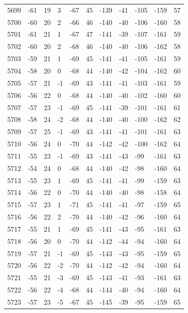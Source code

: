 \begin{table}[H]
\begin{tabular}{lllllllllll}
5699 & -61 & 19 & 3 & -67 & 45 & -139 & -41 & -105 & -159 & 57 \\
5700 & -60 & 20 & 2 & -66 & 46 & -140 & -40 & -106 & -160 & 58 \\
5701 & -61 & 21 & 1 & -67 & 47 & -141 & -39 & -107 & -161 & 59 \\
5702 & -60 & 20 & 2 & -68 & 46 & -140 & -40 & -106 & -162 & 58 \\
5703 & -59 & 21 & 1 & -69 & 45 & -141 & -41 & -105 & -161 & 59 \\
5704 & -58 & 20 & 0 & -68 & 44 & -140 & -42 & -104 & -162 & 60 \\
5705 & -57 & 21 & -1 & -69 & 43 & -141 & -41 & -103 & -161 & 59 \\
5706 & -56 & 22 & 0 & -68 & 44 & -140 & -40 & -102 & -160 & 60 \\
5707 & -57 & 23 & -1 & -69 & 45 & -141 & -39 & -101 & -161 & 61 \\
5708 & -58 & 24 & -2 & -68 & 44 & -140 & -40 & -100 & -162 & 62 \\
5709 & -57 & 25 & -1 & -69 & 43 & -141 & -41 & -101 & -161 & 63 \\
5710 & -56 & 24 & 0 & -70 & 44 & -142 & -42 & -100 & -162 & 64 \\
5711 & -55 & 23 & -1 & -69 & 43 & -141 & -43 & -99 & -161 & 63 \\
5712 & -54 & 24 & 0 & -68 & 44 & -140 & -42 & -98 & -160 & 64 \\
5713 & -55 & 23 & 1 & -69 & 45 & -141 & -41 & -99 & -159 & 63 \\
5714 & -56 & 22 & 0 & -70 & 44 & -140 & -40 & -98 & -158 & 64 \\
5715 & -57 & 23 & 1 & -71 & 45 & -141 & -41 & -97 & -159 & 65 \\
5716 & -56 & 22 & 2 & -70 & 44 & -140 & -42 & -96 & -160 & 64 \\
5717 & -55 & 21 & 1 & -69 & 45 & -141 & -43 & -95 & -161 & 63 \\
5718 & -56 & 20 & 0 & -70 & 44 & -142 & -44 & -94 & -160 & 64 \\
5719 & -57 & 21 & -1 & -69 & 45 & -143 & -43 & -95 & -159 & 65 \\
5720 & -56 & 22 & -2 & -70 & 44 & -142 & -42 & -94 & -160 & 64 \\
5721 & -55 & 21 & -3 & -69 & 45 & -143 & -41 & -93 & -161 & 63 \\
5722 & -56 & 22 & -4 & -68 & 44 & -144 & -40 & -94 & -160 & 64 \\
5723 & -57 & 23 & -5 & -67 & 45 & -145 & -39 & -95 & -159 & 65 \\

\end{tabular}
\end{table}
